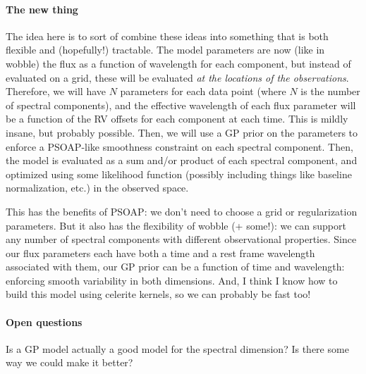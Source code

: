 \documentclass[10pt]{article}
\begin{document}
\paragraph{The new thing}

The idea here is to sort of combine these ideas into something that is both flexible and (hopefully!) tractable.
The model parameters are now (like in wobble) the flux as a function of wavelength for each component, but instead of evaluated on a grid, these will be evaluated \emph{at the locations of the observations}.
Therefore, we will have $N$ parameters for each data point (where $N$ is the number of spectral components), and the effective wavelength of each flux parameter will be a function of the RV offsets for each component at each time.
This is mildly insane, but probably possible.
Then, we will use a GP prior on the parameters to enforce a PSOAP-like smoothness constraint on each spectral component.
Then, the model is evaluated as a sum and/or product of each spectral component, and optimized using some likelihood function (possibly including things like baseline normalization, etc.) in the observed space.

This has the benefits of PSOAP: we don't need to choose a grid or regularization parameters.
But it also has the flexibility of wobble (+ some!): we can support any number of spectral components with different observational properties.
Since our flux parameters each have both a time and a rest frame wavelength associated with them, our GP prior can be a function of time and wavelength: enforcing smooth variability in both dimensions.
And, I think I know how to build this model using celerite kernels, so we can probably be fast too!

\paragraph{Open questions}

Is a GP model actually a good model for the spectral dimension?
Is there some way we could make it better?

\clearpage\raggedright

\end{document}
